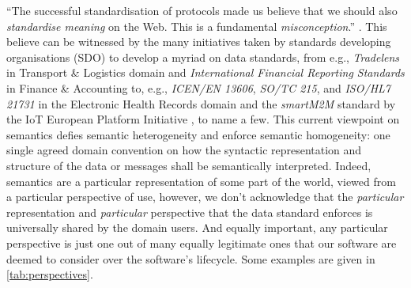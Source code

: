 \documentclass[sort&compress,preprint,authoryear,3p,twocolumn]{elsarticle}
\begin{document}
``The successful standardisation of protocols made us believe that we
should also \emph{standardise meaning} on the Web. This is a fundamental
\emph{misconception}.'' \citep{Janowicz:2013ui}. This believe can be
witnessed by the many initiatives taken by standards developing
organisations (SDO) to develop a myriad on data standards, from e.g.,
\emph{Tradelens} in Transport \& Logistics domain and
\emph{International Financial Reporting Standards} in Finance \&
Accounting to, e.g., \emph{ICEN/EN 13606}, \emph{SO/TC 215}, and
\emph{ISO/HL7 21731} in the Electronic Health Records domain and the
\emph{smartM2M} standard by the IoT European Platform Initiative
\citep{ETSI2019}, to name a few. This current viewpoint on semantics
defies semantic heterogeneity and enforce semantic homogeneity: one
single agreed domain convention on how the syntactic representation and
structure of the data or messages shall be semantically interpreted.
Indeed, semantics are a particular representation of some part of the
world, viewed from a particular perspective of use, however, we don't
acknowledge that the \emph{particular} representation and
\emph{particular} perspective that the data standard enforces is
universally shared by the domain users. And equally important, any
particular perspective is just one out of many equally legitimate ones
that our software are deemed to consider over the software's lifecycle.
Some examples are given in \cref{tab:perspectives}.
\end{document}

